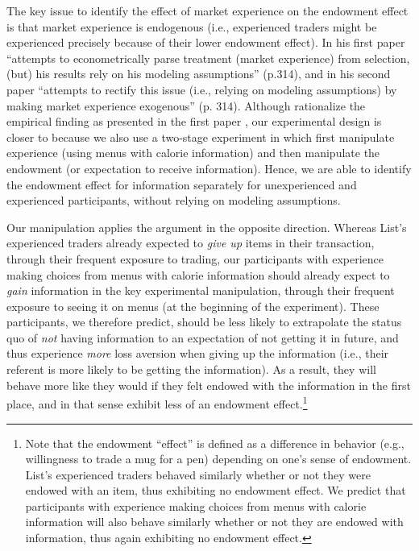 {The key issue to identify the effect of market experience on the endowment effect is that market experience is endogenous (i.e., experienced traders might be experienced precisely because of their lower endowment effect). In his first paper \cite{listDoesMarketExperience2003} \enquote{attempts to econometrically parse treatment (market experience) from selection, (but) his results rely on his modeling assumptions} (p.314), and in his second paper \cite{listDoesMarketExperience2011} \enquote{attempts to rectify this issue (i.e., relying on modeling assumptions) by making market experience exogenous} (p. 314). Although \citet{koszegiModelReferenceDependentPreferences2006} rationalize the empirical finding as presented in the first paper \citep{listDoesMarketExperience2003}, our experimental design is closer to \citep{listDoesMarketExperience2011} because we also use a two-stage experiment in which first manipulate experience (using menus with calorie information) and then manipulate the endowment (or expectation to receive information). Hence, we are able to identify the endowment effect for information separately for unexperienced and experienced participants, without relying on modeling assumptions.}


Our manipulation applies the argument in the opposite direction. Whereas List’s experienced traders already expected to \emph{give up} items in their transaction, through their frequent exposure to trading, our participants with experience making choices from menus with calorie information should already expect to \emph{gain} information in the key experimental manipulation, through their frequent exposure to seeing it on menus (at the beginning of the experiment). These participants, we therefore predict, should be less likely to extrapolate the status quo of \emph{not} having information to an expectation of not getting it in future, and thus experience \emph{more} loss aversion when giving up the information (i.e., their referent is more likely to be getting the information). As a result, they will behave more like they would if they felt endowed with the information in the first place, and in that sense exhibit less of an endowment effect.\footnote{Note that the endowment \enquote{effect} is defined as a difference in behavior (e.g., willingness to trade a mug for a pen) depending on one’s sense of endowment. List’s experienced traders behaved similarly whether or not they were endowed with an item, thus exhibiting no endowment effect. We predict that participants with experience making choices from menus with calorie information will also behave similarly whether or not they are endowed with information, thus again exhibiting no endowment effect.}

